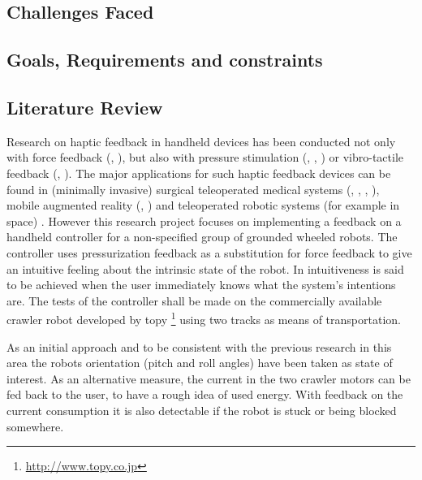 \subsection{Challenges Faced}


\subsection{Goals, Requirements and constraints}

\subsection{Literature Review}
Research on haptic feedback in handheld devices has been conducted not only with force feedback (\cite{Prattichizzo2012}, \cite{Schoonmaker2006}), but also with pressure stimulation (\cite{Ajoudani2014}, \cite{Asada2016}, \cite{Nakamura2016}) or vibro-tactile feedback (\cite{Ajoudani2014}, \cite{Foottit2014}). The major applications for such haptic feedback devices can be found in (minimally invasive) surgical teleoperated medical systems (\cite{Bedem2009}, \cite{Enayati2016}, \cite{Tavakoli2004}, \cite{Nisky2011}), mobile augmented reality (\cite{Bermejo2017}, \cite{Hasegawa2006}) and teleoperated robotic systems (for example in space) \cite{Christiansson2007}. However this research project focuses on implementing a feedback on a handheld controller for a non-specified group of grounded wheeled robots. The controller uses pressurization feedback as a substitution for force feedback to give an intuitive feeling about the intrinsic state of the robot. In \cite{Mugge2016} intuitiveness is said to be achieved when the user immediately knows what the system's intentions are. The tests of the controller shall be made on the commercially available crawler robot developed by topy \footnote{\url{http://www.topy.co.jp}} using two tracks as means of transportation.
	
As an initial approach and to be consistent with the previous research in this area \cite{Asada2016a} the robots orientation (pitch and roll angles) have been taken as state of interest. As an alternative measure, the current in the two crawler motors can be fed back to the user, to have a rough idea of used energy. With feedback on the current consumption it is also detectable if the robot is stuck or being blocked somewhere.


\newpage